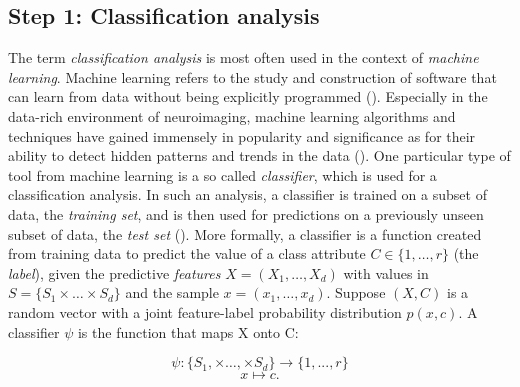 \documentclass[a4paper, 12pt]{scrreprt}
\begin{document}
\subsection{Step 1: Classification analysis}
The term \textit{classification analysis} is most often used in the context of \textit{machine learning}. Machine learning refers to the study and construction of software that can learn from data without being explicitly programmed (\cite{zeigermann2018machine}). Especially in the data-rich environment of neuroimaging, machine learning algorithms and techniques have gained immensely in popularity and significance as for their ability to detect hidden patterns and trends in the data (\cite{vogt2018machine}). One particular type of tool from machine learning is a so called \textit{classifier}, which is used for a classification analysis. In such an analysis, a classifier is trained on a subset of data, the \textit{training set}, and is then used for predictions on a previously unseen subset of data, the \textit{test set} (\cite{zeigermann2018machine}). \newline
More formally, a classifier is a function created from training data to predict the value of a class attribute $C \in \{1, \ldots, r\}$ (the \textit{label}), given the predictive \textit{features} $X = (X_1, \ldots, X_d)$  with values in $S = \{S_1 \times \ldots \times S_d\}$ and the sample $x = (x_1, \ldots, x_d)$. Suppose $(X, C)$ is a random vector with a joint feature-label probability distribution $p(x, c)$. A classifier $\psi$ is the function that maps X onto C:

\begin{equation}\label{classifier}
\psi:\{ S_1, \times \ldots, \times S_d \} \rightarrow \{1, ..., r\}
\end{equation}
\begin{equation}
x \mapsto c.
\end{equation}
\end{document}
